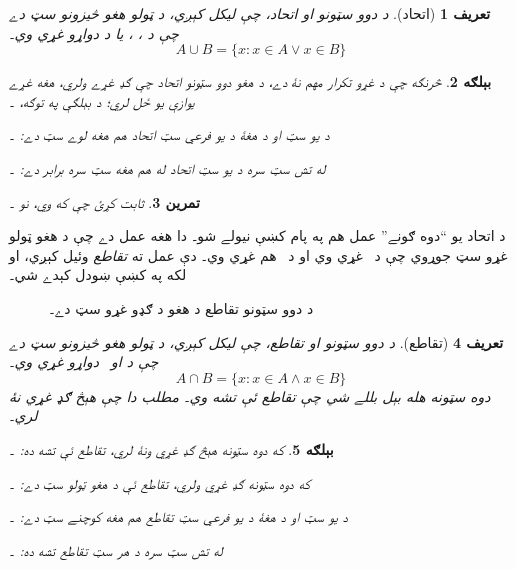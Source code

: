 \documentclass[12pt,a4paper,oneside]{report}
\newcommand{\Setabs}[2]{\{#1 : #2\}}
\newcommand{\ollabel}[1]{\label{\pspart:\pschapter:\pssection:#1}}
\newcommand{\olasset}[1]{\centering\begin{LTR}\centering\resizebox{.46\textwidth}{!}{}\end{LTR}}
\newenvironment{explain}{}{}
\newtheorem{defn}{تعريف}[section]
\newtheorem{ex}[defn]{بېلګه}
\newtheorem{prob}[defn]{تمرين}
\begin{document}
\begin{defn}[اتحاد]
د دوو سټونو  او  \emph{اتحاد}، چې  ليکل کېږي، د ټولو هغو څيزونو سټ دے چې د ، ، يا د دواړو غړي وي۔
\[
A \cup B = \Setabs{x}{x \in A \lor x \in B}
\]
\end{defn}

\begin{ex}
څرنګه چې د غړو تکرار مهم نۀ دے، د هغو دوو سټونو اتحاد چې ګډ غړے ولري، هغه غړے يوازې يو ځل لري؛ د بېلګې په توګه، ۔

د يو سټ او د هغۀ د يو فرعي سټ اتحاد هم هغه لوے سټ دے: ۔

له تش سټ سره د يو سټ اتحاد له هم هغه سټ سره برابر دے: ۔
\end{ex}

\begin{prob}
ثابت کړئ چې که  وي، نو ۔
\end{prob}

\begin{explain}
د اتحاد يو ``دوه ګونے'' عمل هم په پام کښې نيولے شو۔ دا هغه عمل دے چې د هغو ټولو غړو سټ جوړوي چې د~ غړي وي او د~ هم غړي وي۔ دې عمل ته \emph{تقاطع} وئيل کېږي، او لکه په  کښې ښودل کېدے شي۔
\begin{figure}
  \olasset{assets/diagrams/intersection.tikz}
  \caption{د دوو سټونو تقاطع  د هغو د ګډو غړو سټ دے۔}
  \ollabel{fig:intersection}
\end{figure}
\end{explain}

\begin{defn}[تقاطع]
د دوو سټونو  او  \emph{تقاطع}، چې  ليکل کېږي، د ټولو هغو څيزونو سټ دے چې د  او~ دواړو غړي وي۔
\[
A \cap B = \Setabs{x}{x \in A \land x \in B}
\]
دوه سټونه هله \emph{بېل} بللے شي چې تقاطع ئې تشه وي۔ مطلب دا چې هېڅ ګډ غړي نۀ لري۔
\end{defn}

\begin{ex}
که دوه سټونه هېڅ ګډ غړي ونۀ لري، تقاطع ئې تشه ده: ۔

که دوه سټونه ګډ غړي ولري، تقاطع ئې د هغو ټولو سټ دے: ۔

د يو سټ او د هغۀ د يو فرعي سټ تقاطع هم هغه کوچنے سټ دے: ۔

له تش سټ سره د هر سټ تقاطع تشه ده: ۔
\end{ex}
\end{document}
